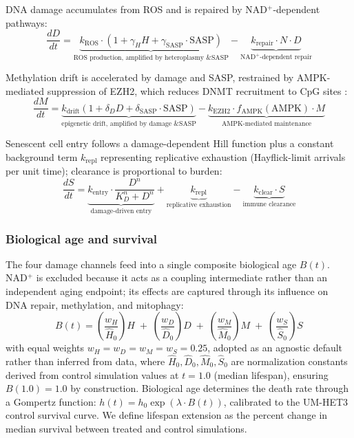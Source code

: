 \documentclass[11pt]{article}
\begin{document}
DNA damage accumulates from ROS and is repaired by NAD$^+$-dependent pathways:
\begin{equation}
\frac{dD}{dt} = \underbrace{k_{\text{ROS}} \cdot (1 + \gamma_H H + \gamma_{\text{SASP}} \cdot \text{SASP})}_{\text{ROS production, amplified by heteroplasmy \& SASP}} - \underbrace{k_{\text{repair}} \cdot N \cdot D}_{\text{NAD$^+$-dependent repair}}
\end{equation}

Methylation drift is accelerated by damage and SASP, restrained by AMPK-mediated suppression of EZH2, which reduces DNMT recruitment to CpG sites \citep{Vire2006}:
\begin{equation}
\frac{dM}{dt} = \underbrace{k_{\text{drift}}(1 + \delta_D D + \delta_{\text{SASP}} \cdot \text{SASP})}_{\text{epigenetic drift, amplified by damage \& SASP}} - \underbrace{k_{\text{EZH2}} \cdot f_{\text{AMPK}}(\text{AMPK}) \cdot M}_{\text{AMPK-mediated maintenance}}
\end{equation}

Senescent cell entry follows a damage-dependent Hill function plus a constant background term $k_{\text{repl}}$ representing replicative exhaustion (Hayflick-limit arrivals per unit time); clearance is proportional to burden:
\begin{equation}
\frac{dS}{dt} = \underbrace{k_{\text{entry}} \cdot \frac{D^n}{K_D^n + D^n}}_{\text{damage-driven entry}} + \underbrace{k_{\text{repl}}}_{\text{replicative exhaustion}} - \underbrace{k_{\text{clear}} \cdot S}_{\text{immune clearance}}
\end{equation}

\subsubsection{Biological age and survival}

The four damage channels feed into a single composite biological age $B(t)$. NAD$^+$ is excluded because it acts as a coupling intermediate rather than an independent aging endpoint; its effects are captured through its influence on DNA repair, methylation, and mitophagy:
\begin{equation}
B(t) = \left(\frac{w_H}{\hat{H}_0}\right)\!H \;+\; \left(\frac{w_D}{\hat{D}_0}\right)\!D \;+\; \left(\frac{w_M}{\hat{M}_0}\right)\!M \;+\; \left(\frac{w_S}{\hat{S}_0}\right)\!S
\end{equation}
with equal weights $w_H = w_D = w_M = w_S = 0.25$, adopted as an agnostic default rather than inferred from data, where $\hat{H}_0, \hat{D}_0, \hat{M}_0, \hat{S}_0$ are normalization constants derived from control simulation values at $t = 1.0$ (median lifespan), ensuring $B(1.0) = 1.0$ by construction. Biological age determines the death rate through a Gompertz function: $h(t) = h_0 \exp(\lambda \cdot B(t))$, calibrated to the UM-HET3 control survival curve. We define lifespan extension as the percent change in median survival between treated and control simulations.
\end{document}
